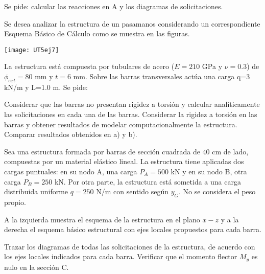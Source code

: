 Se pide: calcular las reacciones en A y los diagramas de solicitaciones.

\begin{center}
	\def\svgwidth{0.5\textwidth}

\end{center}

\ejercicio

Se desea analizar la estructura de un pasamanos considerando un correspondiente Esquema Básico de Cálculo como se muestra en las figuras.

\begin{center}
	\texttt{[image: UT5ej7]}
\end{center}

La estructura está compuesta por tubulares de acero ($E=210$ GPa y $\nu=0.3$) de $\phi_{ext}=80$ mm y $t=6$ mm. %
%
Sobre las barras transversales actúa una carga q=3 kN/m y L=1.0 m. Se pide:

	\parte Considerar que las barras no presentan rigidez a torsión y calcular analíticamente las solicitaciones en cada una de las barras.
\parte Considerar la rigidez a torsión en las barras y obtener resultados de modelar computacionalmente la estructura.
\parte Comparar resultados obtenidos en a) y b).





\ejercicio \label{ejUt5Grua}

Sea una estructura formada por barras de sección cuadrada de $40$ cm de lado, compuestas por un material elástico lineal. La estructura tiene aplicadas dos cargas puntuales: en su nodo A, una carga $P_A = 500$ kN y en su nodo B, otra carga $P_B = 250$ kN. Por otra parte, la estructura está sometida a una carga distribuida uniforme $q= 250 $ N/m con sentido según $y_G$. No se considera el peso propio.

A la izquierda muestra el esquema de la estructura en el plano $x-z$ y a la derecha el esquema básico estructural con ejes locales propuestos para cada barra.

\begin{center}
	\def\svgwidth{\textwidth}
	
\end{center}

Trazar los diagramas de todas las solicitaciones de la estructura, de acuerdo con los ejes locales indicados para cada barra. Verificar que el momento flector $M_y$ es nulo en la sección C.















